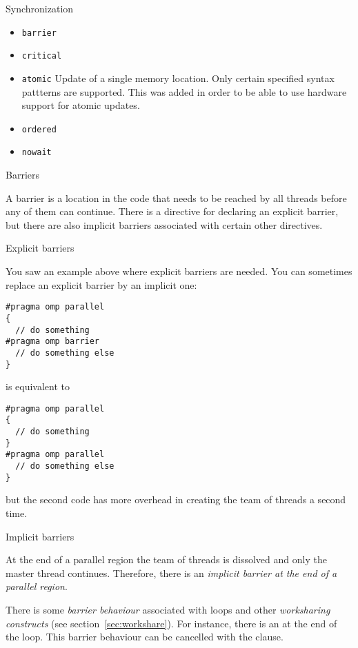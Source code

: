 
 {Synchronization}

\begin{itemize}
\item \texttt{barrier}
\item \texttt{critical}
\item \texttt{atomic} Update of a single memory location. Only certain
  specified syntax pattterns are supported. This was added in order to
  be able to use hardware support for atomic updates.
\item \texttt{ordered}
\item \texttt{nowait}
\end{itemize}

 {Barriers}

A barrier is a location in the code that needs to be reached
by all threads before any of them can continue. There is 
a directive for declaring an explicit barrier, but 
there are also implicit barriers associated with certain other 
directives.

 {Explicit barriers}

You saw an example above where explicit barriers are needed.
You can sometimes replace an explicit barrier by an implicit one:
\begin{verbatim}
#pragma omp parallel
{
  // do something
#pragma omp barrier
  // do something else
}
\end{verbatim}
is equivalent to
\begin{verbatim}
#pragma omp parallel
{
  // do something
}
#pragma omp parallel
  // do something else
}
\end{verbatim}
but the second code has more overhead in creating the team of threads a second time.

 {Implicit barriers}

At the end of a parallel region the team of threads is dissolved and
only the master thread continues. Therefore, there is an
\emph{implicit barrier at the end of a parallel region}.

There is some \emph{barrier behaviour} associated with  loops and other
\emph{worksharing constructs} (see section~\ref{sec:workshare}).  For instance, there
is an  at the end of the loop. This
barrier behaviour can be cancelled with the 
clause.

